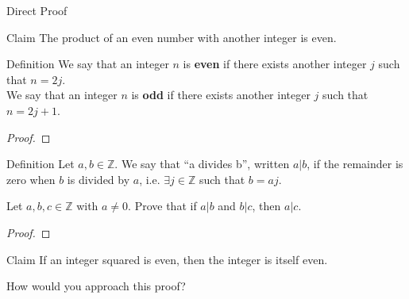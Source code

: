 \documentclass [aspectratio=169]{beamer}
\newcommand{\Z}{{\mathbb{Z}}}
\begin{document}
\begin{frame}{Direct Proof}

\begin{exampleblock}{Claim}
The product of an even number with another integer is even.
\end{exampleblock}


\begin{alertblock}{Definition}
We say that an integer $n$ is {\bf even} if there exists another integer $j$ such that $n=2j$. \\
We say that an integer $n$ is {\bf odd} if there exists another integer $j$ such that $n=2j+1$.
\end{alertblock}

\begin{proof}
\vspace{4em}
\end{proof}

\end{frame}

\begin{frame}
\begin{alertblock}{Definition}
Let $a,b \in \Z$. We say that ``a divides b'', written $a | b$, if the remainder is zero when $b$ is divided by $a$, i.e. $\exists j \in \Z$ such that $b = a j$.
\end{alertblock}


\begin{example}
Let $a,b,c \in \Z$ with $a \neq 0$. Prove that if $a | b$ and $b | c$, then $a | c$.
\end{example}
\begin{proof}
\vspace{4em}
\end{proof}
\end{frame}



\begin{frame}{}
\begin{exampleblock}{Claim}
If an integer squared is even, then the integer is itself even.
\end{exampleblock}

\vspace{1em}

How would you approach this proof?

\end{frame}
\end{document}
